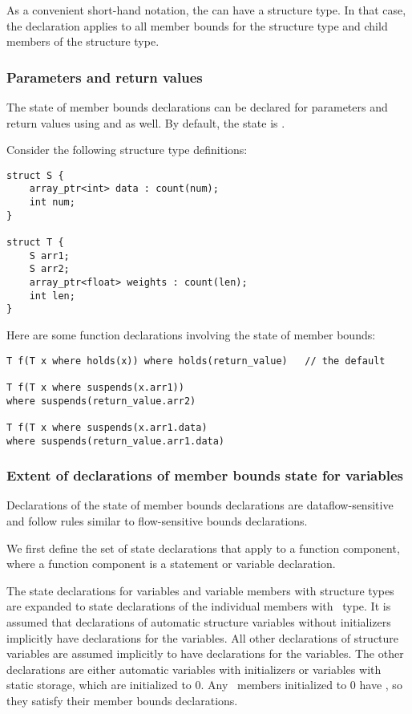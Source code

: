 As a convenient short-hand notation, the  can have
a structure type. In that case, the declaration applies to all member
bounds for the structure type and child members of the structure type.

\subsubsection{Parameters and return values}

The state of member bounds declarations can be declared for parameters and
return values using  and  as well. By
default, the state is .

Consider the following structure type definitions:

\begin{lstlisting}
struct S {
    array_ptr<int> data : count(num);
    int num;
}

struct T {
    S arr1;
    S arr2;
    array_ptr<float> weights : count(len);
    int len;
}
\end{lstlisting}

Here are some function declarations involving the state of member
bounds:
\begin{lstlisting}
T f(T x where holds(x)) where holds(return_value)   // the default 

T f(T x where suspends(x.arr1))
where suspends(return_value.arr2)

T f(T x where suspends(x.arr1.data)
where suspends(return_value.arr1.data)
\end{lstlisting}

\subsubsection{Extent of declarations of member bounds state for variables}
\label{section:member-bounds-state-extent}

Declarations of the state of member bounds declarations are dataflow-sensitive
and follow rules similar to flow-sensitive bounds declarations.

We first define the set of state declarations that apply to a function
component, where a function component is a statement or
variable declaration.

The state declarations for variables and variable members with structure
types are expanded to state declarations of the individual members with
\arrayptr\ type. It is assumed that declarations of automatic
structure variables without initializers implicitly have 
declarations for the variables. All other declarations of structure
variables are assumed implicitly to have  declarations for the
variables. The other declarations are either automatic variables with
initializers or variables with static storage, which are initialized to
0. Any \arrayptr\ members initialized to 0 have \boundsany, so
they satisfy their member bounds declarations.

